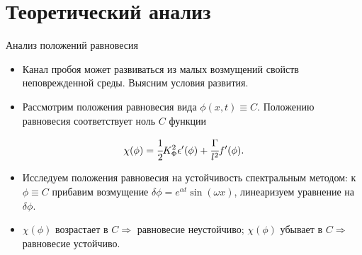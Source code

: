 \section{Теоретический анализ}

\begin{frame}{Анализ положений равновесия}
\begin{itemize}
	\item Канал пробоя может развиваться из малых возмущений свойств неповрежденной среды. Выясним условия развития.
	\item Рассмотрим положения равновесия вида $\phi(x, t) \equiv C$. Положению равновесия соответствует ноль $C$ функции
\end{itemize}
$$\chi(\phi) = \cfrac{1}{2} K_\Phi^2 \epsilon'(\phi) + \cfrac{\Gamma}{l^2} f'(\phi).$$
\vspace{-0.5cm}
\begin{itemize}
	\item Исследуем положения равновесия на устойчивость спектральным методом: к $\phi \equiv C$ прибавим возмущение $\delta \phi = e^{\alpha t} \sin(\omega x)$, линеаризуем уравнение на $\delta \phi$.
	\item $\chi(\phi)$ возрастает в $C \Longrightarrow$ равновесие неустойчиво; $\chi(\phi)$ убывает в $C \Longrightarrow$ равновесие устойчиво.
\end{itemize}
\end{frame}


